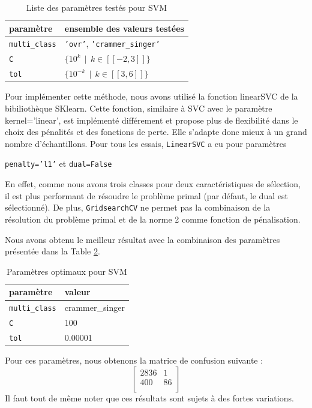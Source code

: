 \documentclass[a4paper]{report}
\begin{document}
\begin{table}
\centering
\begin{tabular}{ll}
paramètre & ensemble des valeurs testées \\
\hline
\texttt{multi\_class} & \texttt{'ovr'}, \texttt{'crammer\_singer'} \\
\texttt{C} & $\{10^k \>\> | \>\> k \in [\![-2, 3]\!] \}$ \\
\texttt{tol} & $\{10^{-k} \>\> | \>\> k \in [\![3, 6]\!] \}$ \\
\end{tabular}
\caption{Liste des paramètres testés pour SVM\label{params_svm}}
\end{table}

\noindent Pour implémenter cette méthode, nous avons utilisé la fonction linearSVC de la bibiliothèque SKlearn. Cette fonction, similaire à SVC avec le paramètre kernel='linear', est implémenté différement et propose plus de flexibilité dans le choix des pénalités et des fonctions de perte. Elle s'adapte donc mieux à un grand nombre d'échantillons. Pour tous les essais, \texttt{LinearSVC} a eu pour paramètres \begin{center}
\texttt{penalty='l1'} et \texttt{dual=False}
\end{center}
En effet, comme nous avons trois classes pour deux caractéristiques de sélection, il est plus performant de résoudre le problème primal (par défaut, le dual est sélectionné). De plus, \texttt{GridsearchCV} ne permet pas la combinaison de la résolution du problème primal et de la norme 2 comme fonction de pénalisation. %

Nous avons obtenu le meilleur résultat avec la combinaison des paramètres présentée dans la Table \ref{best_params_svm}.

\begin{table}
\centering
\begin{tabular}{ll}
paramètre & valeur \\
\hline
\texttt{multi\_class} & crammer\_singer \\
\texttt{C} & 100 \\
\texttt{tol} & 0.00001\\
\end{tabular}
\caption{Paramètres optimaux pour SVM\label{best_params_svm}}
\end{table}

Pour ces paramètres, nous obtenons la matrice de confusion suivante :
$$\begin{bmatrix}
2836 & 1 \\ 
400 & 86 \\
\end{bmatrix}$$
Il faut tout de même noter que ces résultats sont sujets à des fortes variations.
\end{document}

